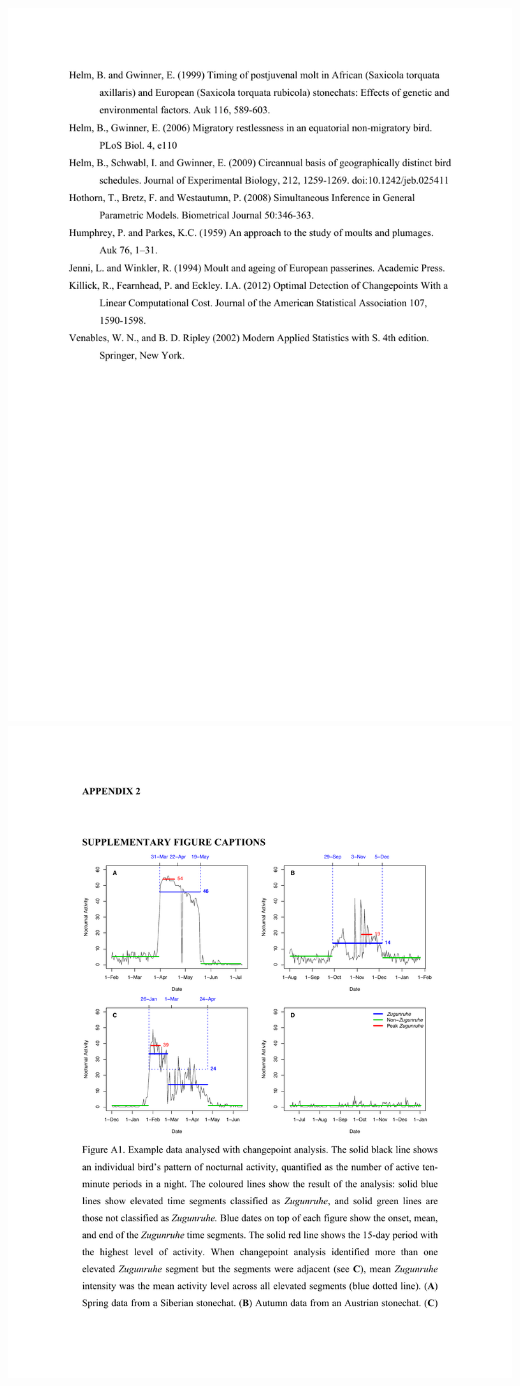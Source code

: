 \documentclass[a4paper, twoside]{templates/ociamthesis}
\begin{document}
\includegraphics[width=1\linewidth]{pdf_chapters/zug/zug_supp_crop_Part10}
\includegraphics[width=1\linewidth]{pdf_chapters/zug/zug_supp_crop_Part11}
\end{document}
